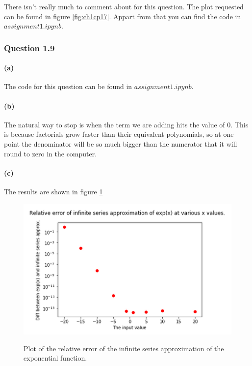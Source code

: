 \documentclass{article}
\begin{document}
There isn't really much to comment about for this question. The plot 
requested can be found in figure \ref{fig:ch1cp17}. Appart from that 
you can find the code in $assignment1.ipynb.$\\




\subsubsection{Question 1.9}

\paragraph{(a)} The code for this question can be found in $assignment1.ipynb.$

\paragraph{(b)} The natural way to stop is when the term we are adding hits the value of 0. This is because factorials grow faster than their equivalent polynomials, so at one point the denominator will be so much bigger than the numerator that it will round to zero in the computer.

\paragraph{(c)} The results are shown in figure \ref{fig:q19}


\begin{figure}
	\includegraphics[width=\textwidth]{exp_infinite_series.png}
	\label{fig:q19}
	\caption{Plot of the relative error of the infinite series approximation
	of the exponential function.}
\end{figure}
\end{document}
